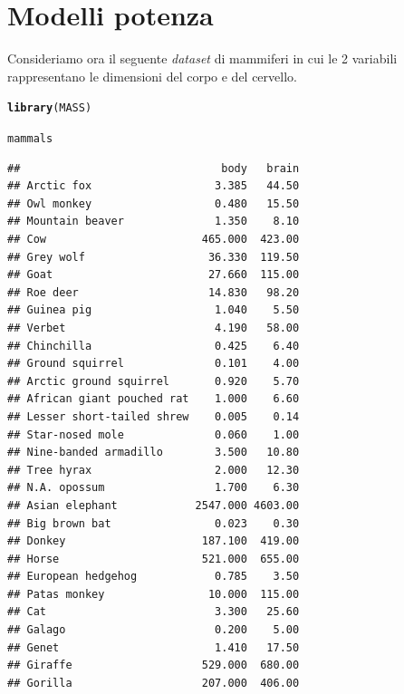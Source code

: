 \documentclass[onecolumn,12pt]{book}\usepackage[]{graphicx}\usepackage[]{color}
\makeatletter
\newcommand{\hlstd}[1]{\textcolor[rgb]{0.345,0.345,0.345}{#1}}%
\newcommand{\hlkwd}[1]{\textcolor[rgb]{0.737,0.353,0.396}{\textbf{#1}}}%
\newenvironment{kframe}{%
 \def\at@end@of@kframe{}%
 \ifinner\ifhmode%
  \def\at@end@of@kframe{\end{minipage}}%
  \begin{minipage}{\columnwidth}%
 \fi\fi%
 \def\FrameCommand##1{\hskip\@totalleftmargin \hskip-\fboxsep
 \colorbox{shadecolor}{##1}\hskip-\fboxsep
     \hskip-\linewidth \hskip-\@totalleftmargin \hskip\columnwidth}%
 \MakeFramed {\advance\hsize-\width
   \@totalleftmargin\z@ \linewidth\hsize
   \@setminipage}}%
 {\par\unskip\endMakeFramed%
 \at@end@of@kframe}
\newenvironment{knitrout}{}{} %
\makeatother
\begin{document}
\section{Modelli potenza}
Consideriamo ora il seguente \emph{dataset} di mammiferi  in cui le 2 variabili rappresentano  le dimensioni del corpo e del cervello.
\begin{knitrout}
\color{fgcolor}\begin{kframe}
\begin{alltt}
\hlkwd{library}\hlstd{(MASS)}
\end{alltt}


{\ttfamily\noindent\itshape\color{messagecolor}{\#\# \\\#\# Attaching package: 'MASS'}}

{\ttfamily\noindent\itshape\color{messagecolor}{\#\# The following object is masked from 'package:EsamiR':\\\#\# \\\#\#\ \ \ \  crabs}}\begin{alltt}
\hlstd{mammals}
\end{alltt}
\begin{verbatim}
##                               body   brain
## Arctic fox                   3.385   44.50
## Owl monkey                   0.480   15.50
## Mountain beaver              1.350    8.10
## Cow                        465.000  423.00
## Grey wolf                   36.330  119.50
## Goat                        27.660  115.00
## Roe deer                    14.830   98.20
## Guinea pig                   1.040    5.50
## Verbet                       4.190   58.00
## Chinchilla                   0.425    6.40
## Ground squirrel              0.101    4.00
## Arctic ground squirrel       0.920    5.70
## African giant pouched rat    1.000    6.60
## Lesser short-tailed shrew    0.005    0.14
## Star-nosed mole              0.060    1.00
## Nine-banded armadillo        3.500   10.80
## Tree hyrax                   2.000   12.30
## N.A. opossum                 1.700    6.30
## Asian elephant            2547.000 4603.00
## Big brown bat                0.023    0.30
## Donkey                     187.100  419.00
## Horse                      521.000  655.00
## European hedgehog            0.785    3.50
## Patas monkey                10.000  115.00
## Cat                          3.300   25.60
## Galago                       0.200    5.00
## Genet                        1.410   17.50
## Giraffe                    529.000  680.00
## Gorilla                    207.000  406.00

\end{verbatim}
\end{kframe}
\end{knitrout}
\end{document}

